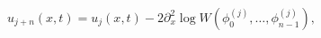 \begin{equation}\label{crum}
u_{j+n}(x,t)=u_j(x,t)-2\partial_x^2\log
W(\phi_0^{(j)},\dots,\phi_{n-1}^{(j)}),
\end{equation}

